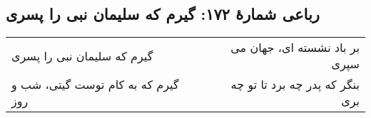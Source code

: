 \begin{center}
\section*{رباعی شمارهٔ ۱۷۲: گیرم که سلیمان نبی را پسری}
\label{sec:172}
\begin{longtable}{l p{0.5cm} r}
گیرم که سلیمان نبی را پسری
&&
بر باد نشسته ای، جهان می سپری
\\
گیرم که به کام توست گیتی، شب و روز
&&
بنگر که پدر چه برد تا تو چه بری
\\
\end{longtable}
\end{center}
